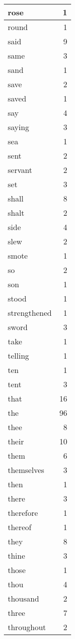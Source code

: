 \begin{center}
\begin{longtable}{l|r}
rose & 1\\ \hline 
round & 1\\ \hline 
said & 9\\ \hline 
same & 3\\ \hline 
sand & 1\\ \hline 
save & 2\\ \hline 
saved & 1\\ \hline 
say & 4\\ \hline 
saying & 3\\ \hline 
sea & 1\\ \hline 
sent & 2\\ \hline 
servant & 2\\ \hline 
set & 3\\ \hline 
shall & 8\\ \hline 
shalt & 2\\ \hline 
side & 4\\ \hline 
slew & 2\\ \hline 
smote & 1\\ \hline 
so & 2\\ \hline 
son & 1\\ \hline 
stood & 1\\ \hline 
strengthened & 1\\ \hline 
sword & 3\\ \hline 
take & 1\\ \hline 
telling & 1\\ \hline 
ten & 1\\ \hline 
tent & 3\\ \hline 
that & 16\\ \hline 
the & 96\\ \hline 
thee & 8\\ \hline 
their & 10\\ \hline 
them & 6\\ \hline 
themselves & 3\\ \hline 
then & 1\\ \hline 
there & 3\\ \hline 
therefore & 1\\ \hline 
thereof & 1\\ \hline 
they & 8\\ \hline 
thine & 3\\ \hline 
those & 1\\ \hline 
thou & 4\\ \hline 
thousand & 2\\ \hline 
three & 7\\ \hline 
throughout & 2\\ \hline 

\end{longtable}
\end{center}
